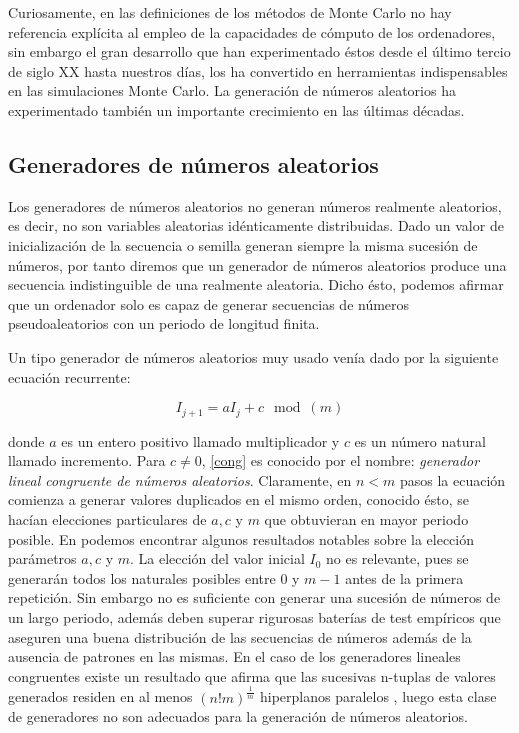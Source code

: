 \documentclass[../proyecto.tex]{memoir}
\begin{document}
Curiosamente, en las definiciones de los métodos de Monte Carlo no hay referencia explícita al empleo de la capacidades de cómputo de los ordenadores, sin embargo el gran desarrollo que han experimentado éstos desde el último tercio de siglo XX hasta nuestros días, los ha convertido en herramientas indispensables en las simulaciones Monte Carlo. La generación de números aleatorios ha experimentado también un importante crecimiento en las últimas décadas.

\subsection{Generadores de números aleatorios}

Los generadores de números aleatorios no generan números realmente aleatorios, es decir, no son variables aleatorias idénticamente distribuidas. Dado un valor de inicialización de la secuencia o semilla generan siempre la misma sucesión de números, por tanto diremos que un generador de números aleatorios produce una secuencia indistinguible de una realmente aleatoria. Dicho ésto, podemos afirmar que un ordenador solo es capaz de generar secuencias de números pseudoaleatorios con un periodo de longitud finita.

 Un tipo generador de números aleatorios muy usado venía dado por la siguiente ecuación recurrente:

\begin{equation} \label{cong}
I_{j+1} = aI_{j} +c \mod (m)
\end{equation}

donde $a$ es un entero positivo llamado multiplicador y $c$ es un número natural llamado incremento. Para $c \neq 0$, \ref{cong} es conocido por el nombre: \textit{generador lineal congruente de números aleatorios}. Claramente, en $n<m$ pasos la ecuación comienza a generar valores duplicados en el mismo orden, conocido ésto, se hacían elecciones particulares de $a,c$ y $m$ que obtuvieran en mayor periodo posible. En \cite{knuth} podemos encontrar algunos resultados notables sobre la elección parámetros $a,c$ y $m$. La elección del valor inicial $I_{0}$ no es relevante, pues se generarán todos los naturales posibles entre $0$ y $m-1$ antes de la primera repetición. Sin embargo no es suficiente con generar una sucesión de números de un largo periodo, además deben superar rigurosas baterías de test empíricos que aseguren una buena distribución de las secuencias de números además de la ausencia de patrones en las mismas. En el caso de los generadores lineales congruentes existe un resultado que afirma que las sucesivas n-tuplas de valores generados residen en al menos $(n!m)^\frac{1}{m}$ hiperplanos paralelos \cite{marsagliaRandom}, luego esta clase de generadores no son adecuados para la generación de números aleatorios.
\end{document}
